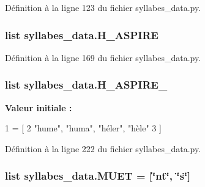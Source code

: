 Définition à la ligne 123 du fichier syllabes\+\_\+data.\+py.

\hypertarget{namespacesyllabes__data_ac965a645cd2edfa246e2b87a7b366f16}{}
\subsubsection[{H\+\_\+\+A\+S\+P\+I\+R\+E}]{\setlength{\rightskip}{0pt plus 5cm}list syllabes\+\_\+data.\+H\+\_\+\+A\+S\+P\+I\+R\+E}\label{namespacesyllabes__data_ac965a645cd2edfa246e2b87a7b366f16}


Définition à la ligne 169 du fichier syllabes\+\_\+data.\+py.

\hypertarget{namespacesyllabes__data_abee2655af7fb8237506dc94d013e241b}{}
\subsubsection[{H\+\_\+\+A\+S\+P\+I\+R\+E\+\_\+2}]{\setlength{\rightskip}{0pt plus 5cm}list syllabes\+\_\+data.\+H\+\_\+\+A\+S\+P\+I\+R\+E\+\_}\label{namespacesyllabes__data_abee2655af7fb8237506dc94d013e241b}
{\bfseries Valeur initiale \+:}
\begin{DoxyCode}
1 = [
2 \textcolor{stringliteral}{"hume"}, \textcolor{stringliteral}{"huma"}, \textcolor{stringliteral}{"héler"}, \textcolor{stringliteral}{"hèle"}
3 ]
\end{DoxyCode}


Définition à la ligne 222 du fichier syllabes\+\_\+data.\+py.

\hypertarget{namespacesyllabes__data_a4d0f3acd04fcc5724d265b00cc8891fb}{}
\subsubsection[{M\+U\+E\+T}]{\setlength{\rightskip}{0pt plus 5cm}list syllabes\+\_\+data.\+M\+U\+E\+T = \mbox{[}\char`\"{}nt\char`\"{}, \char`\"{}s\char`\"{}\mbox{]}}\label{namespacesyllabes__data_a4d0f3acd04fcc5724d265b00cc8891fb}


